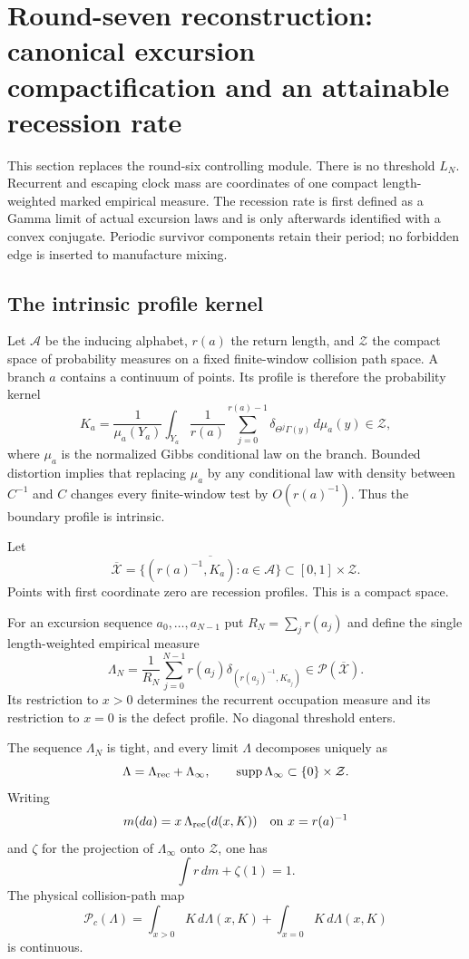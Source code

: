 \section{Round-seven reconstruction: canonical excursion compactification and an attainable recession rate}
\label{sec:r7-a3}

This section replaces the round-six controlling module.  There is no threshold
$L_N$.  Recurrent and escaping clock mass are coordinates of one compact
length-weighted marked empirical measure.  The recession rate is first defined
as a Gamma limit of actual excursion laws and is only afterwards identified
with a convex conjugate.  Periodic survivor components retain their period;
no forbidden edge is inserted to manufacture mixing.

\subsection{The intrinsic profile kernel}

Let $\mathcal A$ be the inducing alphabet, $r(a)$ the return length, and
$\mathcal Z$ the compact space of probability measures on a fixed finite-window
collision path space.  A branch $a$ contains a continuum of points.  Its
profile is therefore the probability kernel
\[
 K_a=\frac{1}{\mu_a(Y_a)}
       \int_{Y_a}\frac1{r(a)}\sum_{j=0}^{r(a)-1}
       \delta_{\Theta^j\Gamma(y)}\,d\mu_a(y)
 \in\mathcal Z,
\]
where $\mu_a$ is the normalized Gibbs conditional law on the branch.  Bounded
distortion implies that replacing $\mu_a$ by any conditional law with density
between $C^{-1}$ and $C$ changes every finite-window test by $O(r(a)^{-1})$.
Thus the boundary profile is intrinsic.

Let
\[
 \overline{\mathcal X}=
 \overline{\{(r(a)^{-1},K_a):a\in\mathcal A\}}
 \subset[0,1]\times\mathcal Z.
\]
Points with first coordinate zero are recession profiles.  This is a compact
space.

For an excursion sequence $a_0,\ldots,a_{N-1}$ put
$R_N=\sum_jr(a_j)$ and define the single length-weighted empirical measure
\[
 \Lambda_N=\frac1{R_N}\sum_{j=0}^{N-1}r(a_j)
 \delta_{(r(a_j)^{-1},K_{a_j})}
 \in\mathcal P(\overline{\mathcal X}).
\]
Its restriction to $x>0$ determines the recurrent occupation measure and its
restriction to $x=0$ is the defect profile.  No diagonal threshold enters.

\begin{lemma}
\label{lem:r7-a3-compact}
The sequence $\Lambda_N$ is tight, and every limit $\Lambda$ decomposes
uniquely as
\[
 \Lambda=\Lambda_{\rm rec}+\Lambda_\infty,
 \qquad
 \operatorname{supp}\Lambda_\infty\subset\{0\}\times\mathcal Z.
\]
Writing
\[
 m(da)=x\,\Lambda_{\rm rec}(d(x,K))
 \quad\hbox{on }x=r(a)^{-1}
\]
and $\zeta$ for the projection of $\Lambda_\infty$ onto $\mathcal Z$, one has
\[
 \int r\,dm+\zeta(1)=1.
\]
The physical collision-path map
\[
 \mathscr P_c(\Lambda)=
 \int_{x>0}K\,d\Lambda(x,K)+
 \int_{x=0}K\,d\Lambda(x,K)
\]
is continuous.
\end{lemma}

